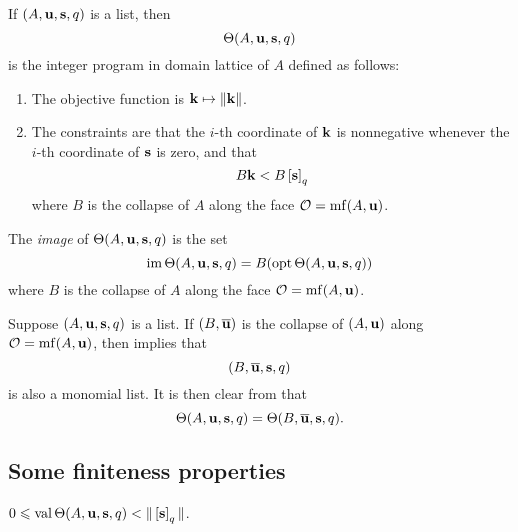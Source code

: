 \documentclass[11pt]{amsart}
\begin{document}
\begin{definition}  
\label{aux program: D}
If $(A, \mathbf{u}, \mathbf{s}, q)$ is a list, then
\[ \Theta(A, \mathbf{u}, \mathbf{s}, q) \] 
is the integer program in domain lattice of $A$ defined as follows:
\begin{enumerate}
\item The objective function is $\mathbf{k} \mapsto \| \mathbf{k} \|$.
\item The constraints are that the $i$-th coordinate of $\mathbf{k}$ is nonnegative whenever the $i$-th coordinate of $\mathbf{s}$ is zero, and that \[ B \mathbf{k}  < B \left[ \mathbf{s} \right]_q\]
where $B$ is the collapse of $A$ along the face $\mathcal{O} = \operatorname{mf}(A, \mathbf{u})$.
\end{enumerate}
\end{definition}

\begin{definition}
The \emph{image} of $\Theta(A, \mathbf{u}, \mathbf{s}, q)$ is the set \[ \operatorname{im} \Theta(A, \mathbf{u}, \mathbf{s}, q)  = B (\operatorname{opt} \Theta(A, \mathbf{u}, \mathbf{s}, q))\] 
where $B$ is the collapse of $A$ along the face $\mathcal{O} = \operatorname{mf}(A, \mathbf{u})$.
\end{definition}

\begin{remark}
\label{collapsed aux program: R}
Suppose $(A, \mathbf{u}, \mathbf{s}, q)$ is a list.  If $(B, \overline{\mathbf{u}})$ is the collapse of $(A ,\mathbf{u})$ along $\mathcal{O} = \operatorname{mf}(A, \mathbf{u})$, then  implies that 
\[ (B, \overline{\mathbf{u}}, \mathbf{s}, q) \] is also a monomial list.  It is then clear from  that 
\[ \Theta(A, \mathbf{u}, \mathbf{s}, q) = \Theta(B, \overline{\mathbf{u}}, \mathbf{s}, q). \] 
\end{remark}

\subsection{Some finiteness properties}  

\begin{lemma}
\label{bounded value: L} 
$0 \leqslant  \operatorname{val}  \Theta(A, \mathbf{u}, \mathbf{s}, q) < \| \left[ \mathbf{s} \right]_q \|$.  
\end{lemma}
\end{document}
